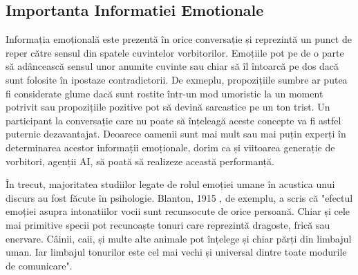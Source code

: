 \documentclass[a4paper,12pt]{book}
\begin{document}
			\subsection{Importanta Informatiei Emotionale}
				Informația emoțională este prezentă în orice conversație și reprezintă un punct de reper către sensul din spatele cuvintelor vorbitorilor. Emoțiile pot pe de o parte să adâncească sensul unor anumite cuvinte sau chiar să îl întoarcă pe dos dacă sunt folosite în ipostaze contradictorii. De exmeplu, propozițiile sumbre ar putea fi considerate glume dacă sunt rostite într-un mod umoristic la un moment potrivit sau propozițiile pozitive pot să devină sarcastice pe un ton trist. Un participant la conversație care nu poate să înțeleagă aceste concepte va fi astfel puternic dezavantajat. Deoarece oamenii sunt mai mult sau mai puțin experți în determinarea acestor informații emoționale, dorim ca și viitoarea generație de vorbitori, agenții AI, să poată să realizeze această performanță.\par
				În trecut, majoritatea studiilor legate de rolul emoției umane în acustica unui discurs au fost făcute în psihologie. Blanton, 1915 \cite{blanton}, de exemplu, a scris că "efectul emoției asupra intonatiilor vocii sunt recunsocute de orice persoană. Chiar și cele mai primitive specii pot recunoaște tonuri care reprezintă dragoste, frică sau enervare. Câinii, caii, și multe alte animale pot înțelege și chiar părți din limbajul uman. Iar limbajul tonurilor este cel mai vechi și universal dintre toate modurile de comunicare".\par 
\end{document}

